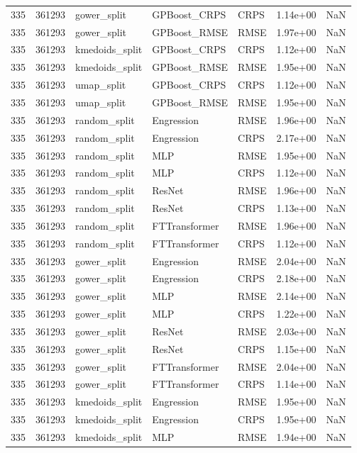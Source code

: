 \begin{tabular}{rrlllrr}
335 & 361293 & gower\_split & GPBoost\_CRPS & CRPS & 1.14e+00 & NaN \\
335 & 361293 & gower\_split & GPBoost\_RMSE & RMSE & 1.97e+00 & NaN \\
335 & 361293 & kmedoids\_split & GPBoost\_CRPS & CRPS & 1.12e+00 & NaN \\
335 & 361293 & kmedoids\_split & GPBoost\_RMSE & RMSE & 1.95e+00 & NaN \\
335 & 361293 & umap\_split & GPBoost\_CRPS & CRPS & 1.12e+00 & NaN \\
335 & 361293 & umap\_split & GPBoost\_RMSE & RMSE & 1.95e+00 & NaN \\
335 & 361293 & random\_split & Engression & RMSE & 1.96e+00 & NaN \\
335 & 361293 & random\_split & Engression & CRPS & 2.17e+00 & NaN \\
335 & 361293 & random\_split & MLP & RMSE & 1.95e+00 & NaN \\
335 & 361293 & random\_split & MLP & CRPS & 1.12e+00 & NaN \\
335 & 361293 & random\_split & ResNet & RMSE & 1.96e+00 & NaN \\
335 & 361293 & random\_split & ResNet & CRPS & 1.13e+00 & NaN \\
335 & 361293 & random\_split & FTTransformer & RMSE & 1.96e+00 & NaN \\
335 & 361293 & random\_split & FTTransformer & CRPS & 1.12e+00 & NaN \\
335 & 361293 & gower\_split & Engression & RMSE & 2.04e+00 & NaN \\
335 & 361293 & gower\_split & Engression & CRPS & 2.18e+00 & NaN \\
335 & 361293 & gower\_split & MLP & RMSE & 2.14e+00 & NaN \\
335 & 361293 & gower\_split & MLP & CRPS & 1.22e+00 & NaN \\
335 & 361293 & gower\_split & ResNet & RMSE & 2.03e+00 & NaN \\
335 & 361293 & gower\_split & ResNet & CRPS & 1.15e+00 & NaN \\
335 & 361293 & gower\_split & FTTransformer & RMSE & 2.04e+00 & NaN \\
335 & 361293 & gower\_split & FTTransformer & CRPS & 1.14e+00 & NaN \\
335 & 361293 & kmedoids\_split & Engression & RMSE & 1.95e+00 & NaN \\
335 & 361293 & kmedoids\_split & Engression & CRPS & 1.95e+00 & NaN \\
335 & 361293 & kmedoids\_split & MLP & RMSE & 1.94e+00 & NaN \\

\end{tabular}
